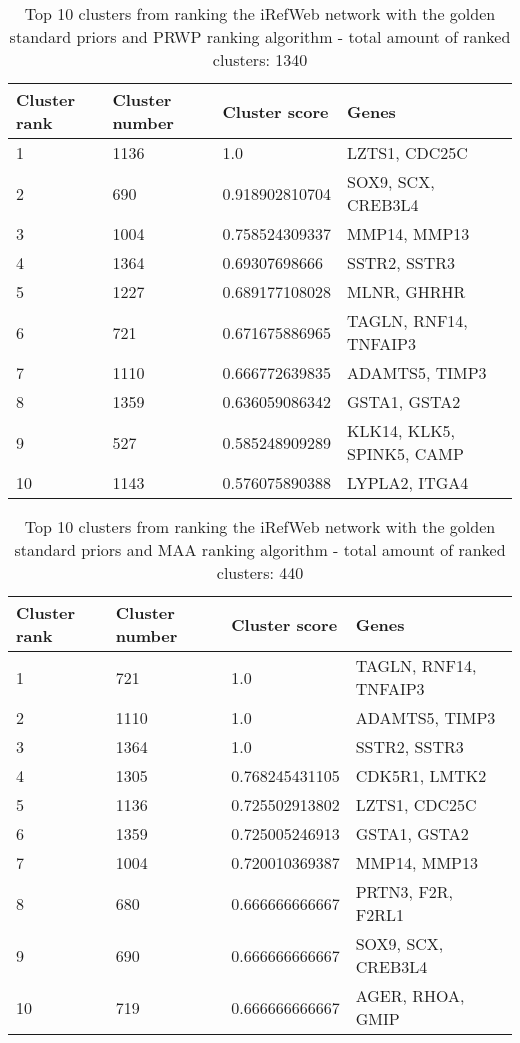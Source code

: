 \begin{table}[H]
    \begin{tabular}{l l l l}
        \textbf{Cluster rank} & \textbf{Cluster number} & \textbf{Cluster score} & \textbf{Genes} \\
        \hline
        1 & 1136	& 1.0	& LZTS1, CDC25C \\
        2 & 690	& 0.918902810704	& SOX9, SCX, CREB3L4 \\
        3 & 1004	& 0.758524309337	& MMP14, MMP13 \\
        4 & 1364	& 0.69307698666	& SSTR2, SSTR3 \\
        5 & 1227	& 0.689177108028	& MLNR, GHRHR \\
        6 & 721	& 0.671675886965	& TAGLN, RNF14, TNFAIP3 \\
        7 & 1110	& 0.666772639835	& ADAMTS5, TIMP3 \\
        8 & 1359	& 0.636059086342	& GSTA1, GSTA2 \\
        9 & 527	& 0.585248909289	& KLK14, KLK5, SPINK5, CAMP \\
        10 & 1143	& 0.576075890388	& LYPLA2, ITGA4 \\
        \hline
    \end{tabular}
    \caption{Top 10 clusters from ranking the iRefWeb network with the golden
    standard priors and PRWP ranking algorithm - total amount of ranked
    clusters: 1340}
    \label{tab:top10-prwp}
\end{table}
\begin{table}[H]
    \begin{tabular}{l l l l}
        \textbf{Cluster rank} & \textbf{Cluster number} & \textbf{Cluster score} & \textbf{Genes} \\
        \hline
        1 & 721	& 1.0	& TAGLN, RNF14, TNFAIP3 \\
        2 & 1110	& 1.0	& ADAMTS5, TIMP3 \\
        3 & 1364	& 1.0	& SSTR2, SSTR3 \\
        4 & 1305	& 0.768245431105	& CDK5R1, LMTK2 \\
        5 & 1136	& 0.725502913802	& LZTS1, CDC25C \\
        6 & 1359	& 0.725005246913	& GSTA1, GSTA2 \\
        7 & 1004	& 0.720010369387	& MMP14, MMP13 \\
        8 & 680	& 0.666666666667	& PRTN3, F2R, F2RL1 \\
        9 & 690	& 0.666666666667	& SOX9, SCX, CREB3L4 \\
        10 & 719	& 0.666666666667	& AGER, RHOA, GMIP \\
        \hline
    \end{tabular}
    \caption{Top 10 clusters from ranking the iRefWeb network with the golden
    standard priors and MAA ranking algorithm - total amount of ranked
    clusters: 440}
    \label{tab:top10-maa}
\end{table}

